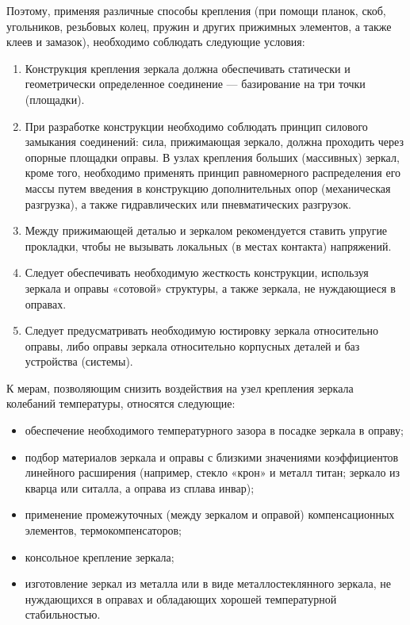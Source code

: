Поэтому, применяя различные способы крепления (при помощи планок, скоб, угольников, резьбовых колец, пружин и других прижимных элементов, а также клеев и замазок), необходимо соблюдать следующие условия:
\begin{enumerate}
\item Конструкция крепления зеркала должна обеспечивать статически и геометрически определенное соединение --- базирование на три точки (площадки).
\item При разработке конструкции необходимо соблюдать принцип силового замыкания соединений: сила, прижимающая зеркало, должна проходить через опорные площадки оправы. В узлах крепления больших (массивных) зеркал, кроме того, необходимо применять принцип равномерного распределения его массы путем введения в конструкцию дополнительных опор (механическая разгрузка), а также гидравлических или пневматических разгрузок.
\item Между прижимающей деталью и зеркалом рекомендуется ставить упругие прокладки, чтобы не вызывать локальных (в местах контакта) напряжений.
\item Следует обеспечивать необходимую жесткость конструкции, используя зеркала и оправы «сотовой» структуры, а также зеркала, не нуждающиеся в оправах.
\item Следует предусматривать необходимую юстировку зеркала относительно оправы, либо оправы зеркала относительно корпусных деталей и баз устройства (системы).
\end{enumerate}

К мерам, позволяющим снизить воздействия на узел крепления зеркала колебаний температуры, относятся следующие:
\begin{itemize}
\item обеспечение необходимого температурного зазора в посадке зеркала в оправу;
\item подбор материалов зеркала и оправы с близкими значениями коэффициентов линейного расширения (например, стекло «крон» и металл титан; зеркало из кварца или ситалла, а оправа из сплава инвар);
\item применение промежуточных (между зеркалом и оправой) компенсационных элементов, термокомпенсаторов;
\item консольное крепление зеркала;
\item изготовление зеркал из металла или в виде металлостеклянного зеркала, не нуждающихся в оправах и обладающих хорошей температурной стабильностью.
\end{itemize}

